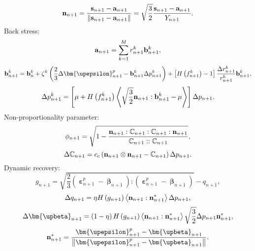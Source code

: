 \begin{equation}
\label{Equ:nn+1}
{{\bf{n}}_{n + 1}} = \frac{{{{\bf{s}}_{n + 1}} - {{\bf{a}}_{n + 1}}}}{{\left\| {{{\bf{s}}_{n + 1}} - {{\bf{a}}_{n + 1}}} \right\|}} = \sqrt {\frac{3}{2}} \frac{{{{\bf{s}}_{n + 1}} - {{\bf{a}}_{n + 1}}}}{{{Y_{n + 1}}}}.
\end{equation}
Back stress:
\begin{equation}
\label{Equ:an+1}
{{\bf{a}}_{n + 1}} = \sum\limits_{k = 1}^M {r_{n + 1}^k{\bf{b}}_{n + 1}^k},
\end{equation}
\begin{equation}
{{\bf{b}}_{n + 1}^k = {\bf{b}}_n^k + {\zeta ^k}\left( {\frac{2}{3}\Delta {\bm{\upepsilon }}_{n + 1}^p - {\bf{b}}_{n + 1}^k\Delta p_{n + 1}^k} \right) + \left[ {H\left( {f_{n + 1}^k} \right) - 1} \right]{\frac{{\Delta r_{n + 1}^k}}{{r_{n + 1}^k}}{\bf{b}}_{n + 1}^k}},
\end{equation}
\begin{equation}
\Delta p_{n + 1}^k = \left[ {\mu  + H\left( {f_{n + 1}^k} \right)\left\langle {\sqrt {\frac{3}{2}} {{\bf{n}}_{n + 1}}:{\bf{b}}_{n + 1}^k - \mu } \right\rangle } \right]\Delta {p_{n + 1}}.
\end{equation}
Non-proportionality parameter:
\begin{equation}
{\phi _{n + 1}} = \sqrt {1 - \frac{{{{\bf{n}}_{n + 1}}:{\mathbb{C}_{n + 1}}:{\mathbb{C}_{n + 1}}:{{\bf{n}}_{n + 1}}}}{{{\mathbb{C}_{n + 1}}::{\mathbb{C}_{n + 1}}}}},
\end{equation}
\begin{equation}
\Delta {\mathbb{C}_{n + 1}} = {c_c}\left( {{{\bf{n}}_{n + 1}} \otimes {{\bf{n}}_{n + 1}} - {\mathbb{C}_{n + 1}}} \right)\Delta {p_{n + 1}}.
\end{equation}
Dynamic recovery:
\begin{equation}
{g_{n + 1}} = \sqrt {\frac{2}{3}\left( {{\bm{\upepsilon }}_{n + 1}^p - {{\bm{\upbeta }}_{n + 1}}} \right):\left( {{\bm{\upepsilon }}_{n + 1}^p - {{\bm{\upbeta }}_{n + 1}}} \right)}  - {q_{n + 1}},
\end{equation}
\begin{equation}
\Delta {q_{n + 1}} = \eta H\left( {{g_{n + 1}}} \right)\left\langle {{{\bf{n}}_{n + 1}}:{\bf{n}}_{n + 1}^*} \right\rangle \Delta {p_{n + 1}},
\end{equation}
\begin{equation}
\Delta {{\bm{\upbeta }}_{n + 1}} = \left( {1 - \eta } \right)H\left( {{g_{n + 1}}} \right)\left\langle {{{\bf{n}}_{n + 1}}:{\bf{n}}_{n + 1}^*} \right\rangle \sqrt {\frac{3}{2}} \Delta {p_{n + 1}}{\bf{n}}_{n + 1}^*,
\end{equation}
\begin{equation}
{\bf{n}}_{n + 1}^* = \frac{{{\bm{\upepsilon }}_{n + 1}^p - {{\bm{\upbeta }}_{n + 1}}}}{{\left\| {{\bm{\upepsilon }}_{n + 1}^p - {{\bm{\upbeta }}_{n + 1}}} \right\|}}.
\end{equation}

